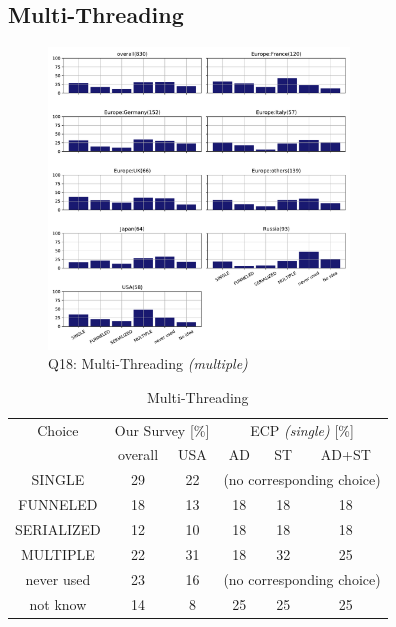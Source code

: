 \documentclass[conference,10pt,letterpaper]{IEEEtran}
\begin{document}
\subsection{Multi-Threading}



\begin{figure}[htb]
\begin{center}
\includegraphics[width=8cm]{Figs/Q18.pdf}
\caption{Q18: Multi-Threading {\it(multiple)}}
\label{fig:multi-thread}
\end{center}
\end{figure}

\begin{table}[htb]%
\begin{center}%
\caption{Multi-Threading}\label{tab:multi-thread}%
\begin{tabular}{c||c|c||c|c|c}%
\hline%
Choice & \multicolumn{2}{c||}{Our Survey [\%]} & 
\multicolumn{3}{c}{ECP {\it(single)} [\%]} \\
\cline{2-6}%
 & overall & USA & AD & ST & AD+ST \\
\hline%
SINGLE & 29 & 22 & \multicolumn{3}{c}{\tiny (no corresponding choice)} \\
FUNNELED & 18 & 13 & 18 & 18 & 18 \\
SERIALIZED & 12 & 10 & 18 & 18 & 18 \\
MULTIPLE & 22 & 31 & 18 & 32 & 25 \\
never used & 23 & 16 & \multicolumn{3}{c}{\tiny (no corresponding choice)} \\
not know & 14 & 8 & 25 & 25 & 25\\
\hline%
\end{tabular}%
\end{center}%
\end{table}%
\end{document}
